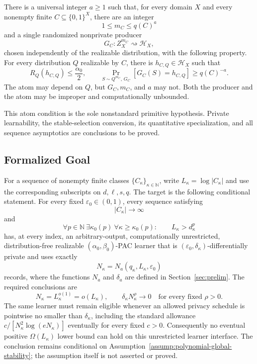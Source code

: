 \begin{assumption}
\label{assump:polynomial-global-stability}
There is a universal integer \(a\geq1\) such that, for every domain
\(X\) and every nonempty finite \(C\subseteq\{0,1\}^X\), there are an
integer
\[
1\leq m_C\leq q(C)^a
\]
and a single randomized nonprivate producer
\[
G_C:Z_X^{m_C}\rightsquigarrow\mathcal H_X,
\]
chosen independently of the realizable distribution, with the
following property.  For every distribution \(Q\) realizable by
\(C\), there is \(h_{C,Q}\in\mathcal H_X\) such that
\[
R_Q(h_{C,Q})\leq\frac{\alpha_0}{2},
\qquad
\Pr_{S\sim Q^{m_C},\,G_C}[G_C(S)=h_{C,Q}]
\geq q(C)^{-a}.
\tag{GS}
\]
The atom may depend on \(Q\), but \(G_C,m_C\), and \(a\) may not.
Both the producer and the atom may be improper and computationally
unbounded.
\end{assumption}

This atom condition is the sole nonstandard primitive hypothesis.
Private learnability, the stable-selection conversion, its
quantitative specialization, and all sequence asymptotics are
conclusions to be proved.

\subsection{Formalized Goal}

For a sequence of nonempty finite classes
\(\{C_\kappa\}_{\kappa\in\mathbb N}\), write
\(L_\kappa=\log|C_\kappa|\) and use the corresponding subscripts on
\(d,\ell,s,q\).  The target is the following conditional statement.
For every fixed \(\varepsilon_0\in(0,1)\), every sequence satisfying
\[
|C_\kappa|\longrightarrow\infty
\]
and
\[
\forall p\in\mathbb N\ \exists\kappa_0(p)\
\forall\kappa\geq\kappa_0(p):
\qquad L_\kappa>d_\kappa^p
\tag{SP}
\]
has, at every index, an arbitrary-output, computationally
unrestricted, distribution-free realizable
\((\alpha_0,\beta_0)\)-PAC learner that is
\((\varepsilon_0,\delta_\kappa)\)-differentially private and uses
exactly
\[
N_\kappa=N_a(q_\kappa,L_\kappa,\varepsilon_0)
\]
records, where the functions \(N_a\) and \(\delta_a\) are defined in
Section~\ref{sec:prelim}.  The required conclusions are
\[
N_\kappa=L_\kappa^{o(1)}=o(L_\kappa),
\qquad
\delta_\kappa N_\kappa^\rho\longrightarrow0
\quad\text{for every fixed }\rho>0.
\]
The same learner must remain eligible whenever an allowed privacy
schedule is pointwise no smaller than \(\delta_\kappa\), including
the standard allowance
\(c/[N_\kappa^2\log(eN_\kappa)]\) eventually for every fixed
\(c>0\).  Consequently no eventual positive
\(\Omega(L_\kappa)\) lower bound can hold on this unrestricted learner
interface.  The conclusion remains conditional on
Assumption~\ref{assump:polynomial-global-stability}; the assumption
itself is not asserted or proved.
